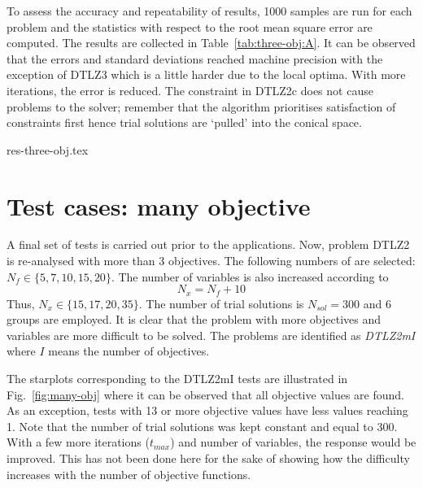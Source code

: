 \documentclass[final,5p,times,twocolumn]{elsarticle}
\newcommand{\figname} {Fig.}
\begin{document}
To assess the accuracy and repeatability of results, 1000 samples are run for each problem and the
statistics with respect to the root mean square error are computed. The results are collected in
Table~\ref{tab:three-obj:A}. It can be observed that the errors and standard deviations reached
machine precision with the exception of DTLZ3 which is a little harder due to the local optima. With
more iterations, the error is reduced. The constraint in DTLZ2c does not cause problems to the
solver; remember that the algorithm prioritises satisfaction of constraints first hence trial
solutions are `pulled' into the conical space.

{res-three-obj.tex}



\section{Test cases: many objective}
\label{sec:multiObj}

A final set of tests is carried out prior to the applications. Now, problem DTLZ2 is re-analysed
with more than 3 objectives. The following numbers of are selected: ${N_f \in \{5, 7, 10, 15,
20\}}$. The number of variables is also increased according to
\begin{equation}
    N_x = N_f + 10
\end{equation}
Thus, ${N_x \in \{15, 17, 20, 35\}}$. The number of trial solutions is $N_{sol}=300$ and 6 groups
are employed. It is clear that the problem with more objectives and variables are more difficult to
be solved. The problems are identified as \emph{DTLZ2mI} where $I$ means the number of objectives.

The starplots corresponding to the DTLZ2mI tests are illustrated in \figname~\ref{fig:many-obj}
where it can be observed that all objective values are found. As an exception, tests with 13 or more
objective values have less values reaching 1. Note that the number of trial solutions was kept
constant and equal to 300. With a few more iterations ($t_{max}$) and number of variables, the
response would be improved. This has not been done here for the sake of showing how the difficulty
increases with the number of objective functions.
\end{document}
